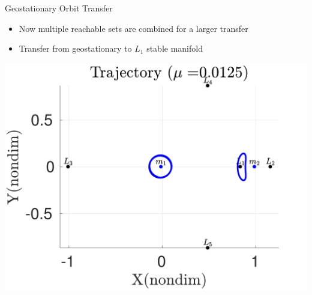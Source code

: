 \begin{frame}{Geostationary Orbit Transfer}
    \begin{itemize}
        \item Now multiple reachable sets are combined for a larger transfer
        \item Transfer from geostationary to \( L_1 \) stable manifold
    \end{itemize}
    \begin{center}
            \includegraphics[height=0.8\textheight]{figures/2017_JAS/initial_final} %
    \end{center}
\end{frame}

